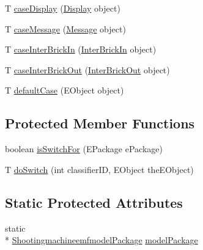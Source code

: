\begin{DoxyCompactItemize}
T \hyperlink{classshootingmachineemfmodel_1_1util_1_1_shootingmachineemfmodel_switch_3_01_t_01_4_a376376ba03305567263f7b31d9228d56}{case\-Display} (\hyperlink{interfaceshootingmachineemfmodel_1_1_display}{Display} object)
\item 
T \hyperlink{classshootingmachineemfmodel_1_1util_1_1_shootingmachineemfmodel_switch_3_01_t_01_4_ae0a44a549d6f6b0582c78bad499325a5}{case\-Message} (\hyperlink{interfaceshootingmachineemfmodel_1_1_message}{Message} object)
\item 
T \hyperlink{classshootingmachineemfmodel_1_1util_1_1_shootingmachineemfmodel_switch_3_01_t_01_4_a46094f16c77d38d6f3c71a10337626f3}{case\-Inter\-Brick\-In} (\hyperlink{interfaceshootingmachineemfmodel_1_1_inter_brick_in}{Inter\-Brick\-In} object)
\item 
T \hyperlink{classshootingmachineemfmodel_1_1util_1_1_shootingmachineemfmodel_switch_3_01_t_01_4_a5fa04618d9f4dcb85430ccdb5609905c}{case\-Inter\-Brick\-Out} (\hyperlink{interfaceshootingmachineemfmodel_1_1_inter_brick_out}{Inter\-Brick\-Out} object)
\item 
T \hyperlink{classshootingmachineemfmodel_1_1util_1_1_shootingmachineemfmodel_switch_3_01_t_01_4_a24899cc299de8c63154bb862c52bbefb}{default\-Case} (E\-Object object)
\end{DoxyCompactItemize}
\subsection*{Protected Member Functions}
\begin{DoxyCompactItemize}
\item 
boolean \hyperlink{classshootingmachineemfmodel_1_1util_1_1_shootingmachineemfmodel_switch_3_01_t_01_4_a047dcb6135236f02315a86c3213519fd}{is\-Switch\-For} (E\-Package e\-Package)
\item 
T \hyperlink{classshootingmachineemfmodel_1_1util_1_1_shootingmachineemfmodel_switch_3_01_t_01_4_a23186dd5b028dc2f72c38da4a98d587e}{do\-Switch} (int classifier\-I\-D, E\-Object the\-E\-Object)
\end{DoxyCompactItemize}
\subsection*{Static Protected Attributes}
\begin{DoxyCompactItemize}
\item 
static \\*
\hyperlink{interfaceshootingmachineemfmodel_1_1_shootingmachineemfmodel_package}{Shootingmachineemfmodel\-Package} \hyperlink{classshootingmachineemfmodel_1_1util_1_1_shootingmachineemfmodel_switch_3_01_t_01_4_a26a922643d840dd98a7add3fb526ed60}{model\-Package}
\end{DoxyCompactItemize}


